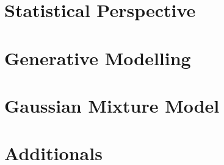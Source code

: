 \begin{multicols*}{4}
            \section{Statistical Perspective}
            
            \section{Generative Modelling}
            
            \section{Gaussian Mixture Model}
            
            \section{Additionals}
            

    \end{multicols*} 
